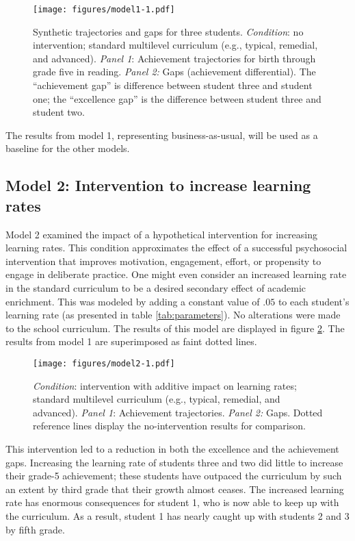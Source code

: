 \documentclass[english,floatsintext,jou]{apa6}
\theoremstyle{definition}
\theoremstyle{definition}
\theoremstyle{definition}
\theoremstyle{remark}
\begin{document}
\begin{figure}[htbp]
\centering
\texttt{[image: figures/model1-1.pdf]}
\caption{\label{fig:model1}Synthetic trajectories and gaps for three
students. \emph{Condition}: no intervention; standard multilevel
curriculum (e.g., typical, remedial, and advanced). \emph{Panel 1}:
Achievement trajectories for birth through grade five in reading.
\emph{Panel 2:} Gaps (achievement differential). The
\enquote{achievement gap} is difference between student three and
student one; the \enquote{excellence gap} is the difference between
student three and student two.}
\end{figure}

The results from model 1, representing business-as-usual, will be used
as a baseline for the other models.

\subsection{Model 2: Intervention to increase learning
rates}\label{model-2-intervention-to-increase-learning-rates}

Model 2 examined the impact of a hypothetical intervention for
increasing learning rates. This condition approximates the effect of a
successful psychosocial intervention that improves motivation,
engagement, effort, or propensity to engage in deliberate practice. One
might even consider an increased learning rate in the standard
curriculum to be a desired secondary effect of academic enrichment. This
was modeled by adding a constant value of \(.05\) to each student's
learning rate (as presented in table \ref{tab:parameters}). No
alterations were made to the school curriculum. The results of this
model are displayed in figure \ref{fig:model2}. The results from model 1
are superimposed as faint dotted lines.

\begin{figure}[htbp]
\centering
\texttt{[image: figures/model2-1.pdf]}
\caption{\label{fig:model2}\emph{Condition}: intervention with additive
impact on learning rates; standard multilevel curriculum (e.g., typical,
remedial, and advanced). \emph{Panel 1}: Achievement trajectories.
\emph{Panel 2:} Gaps. Dotted reference lines display the no-intervention
results for comparison.}
\end{figure}

This intervention led to a reduction in both the excellence and the
achievement gaps. Increasing the learning rate of students three and two
did little to increase their grade-5 achievement; these students have
outpaced the curriculum by such an extent by third grade that their
growth almost ceases. The increased learning rate has enormous
consequences for student 1, who is now able to keep up with the
curriculum. As a result, student 1 has nearly caught up with students 2
and 3 by fifth grade.
\end{document}
